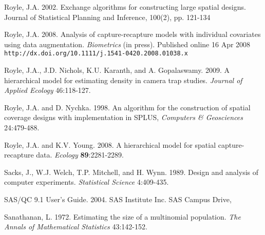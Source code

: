 \documentclass[useAMS,referee]{biom}
\begin{document}
\rf  Royle, J.A. 2002. Exchange algorithms for constructing large spatial 
designs. Journal of Statistical Planning and Inference, 100(2), pp. 121-134

\rf Royle, J.A. 2008.
Analysis of capture-recapture models with individual 
covariates using data augmentation. {\it Biometrics} (in press).
Published online 16 Apr 2008
\mbox{\tt  http://dx.doi.org/10.1111/j.1541-0420.2008.01038.x}



\rf Royle, J.A., J.D. Nichols, K.U. Karanth, and A. Gopalaswamy. 
2009.
A hierarchical model for estimating density in camera trap studies.
{\it Journal of Applied Ecology} 46:118-127.

\rf  Royle, J.A. and D. Nychka. 1998. An algorithm for the construction of 
spatial coverage designs with implementation in SPLUS, {\it Computers \& 
Geosciences} 24:479-488. 

\rf  Royle, J.A. and K.V. Young. 2008. 
A hierarchical model for spatial capture-recapture data.
{\it Ecology} {\bf 89}:2281-2289.

\rf Sacks, J., W.J. Welch, T.P. Mitchell, and H. Wynn. 1989. Design and
analysis of
computer experiments. {\it Statistical Science} 4:409-435.

\rf SAS/QC 9.1 User's Guide. 2004. SAS Institute Inc. SAS Campus
Drive, 

\rf Sanathanan, L. 1972. Estimating the size of a multinomial population.
{\it The Annals of Mathematical Statistics} 43:142-152.

 
 

\end{document}
